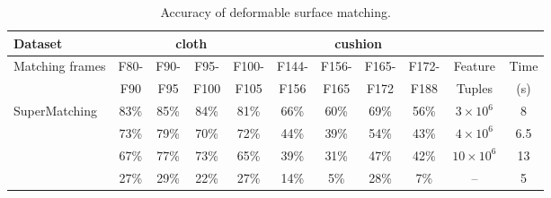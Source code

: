 \begin{table}[tb]
\centering
\tabcolsep=1pt
\setlength{\aboverulesep}{0pt}
\setlength{\belowrulesep}{0pt}
\caption{Accuracy of deformable surface matching.}
\hspace{-5ex}
\label{tab:errorrate1}
\small
\begin{tabular}{l|c c c c | c c c c | c c}
\toprule
{Dataset}  & \multicolumn{4}{|c|}{ {cloth}} & \multicolumn{4}{c|}{ {cushion}} & & \\
\hline
 {Matching frames} &  {F80-}	&  {F90-}	& {F95-}	& {F100-} & {F144-} & {F156-}	& {F165-}	& {F172-} & {Feature}	& {Time}  \\
 {}                &  {F90 }    &  {F95 }   & {F100}    & {F105}  & {F156}  & {F165}    & {F172}    & {F188}  & {Tuples}    &  {(s)} \\
\hline
 {SuperMatching}   &  {83\%}    &  {85\%}	& {84\%} 	& {81\%}  & {66\%}	& {60\%}	& {69\%}	& {56\%}  &  {$3\times10^6$}  &  {8}  \\
 {\cite{Zass08}}   & {73\%}	    & {79\%}	& {70\%}	& {72\%}  & {44\%}  & {39\%}    & {54\%}	& {43\%}   & {$4\times10^6$}   & {6.5}  \\
{\cite{Duchenne09}} & {67\%}    & {77\%}    & {73\%}	& {65\%}  & {39\%}	& {31\%}	& {47\%}	& {42\%}   & {$10\times10^6$}  & {13}  \\
 {\cite{Cour06}}   & {27\%}     & {29\%}	&  {22\%}	& {27\%}  & {14\%}  & {5\%}	    & {28\%}	& {7\%}    & {--}       & {5}  \\
\bottomrule
\end{tabular}%
\end{table}%

